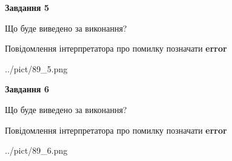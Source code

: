 \documentclass[12pt, ukrainian]{article}
\begin{document}
{{\begin {center}\textbf{Завдання 5}\end {center}}\par
Що буде виведено за виконання? \par
Повідомлення інтерпретатора про помилку позначати \textbf{error}

\begin{center}
	{../pict/89_5.png}
\end{center}
\newpage

{\begin {center}\textbf{Завдання 6}\end {center}}\par
Що буде виведено за виконання? \par
Повідомлення інтерпретатора про помилку позначати \textbf{error}

\begin{center}
	{../pict/89_6.png}
\end{center}
\newpage

}
\end{document}
